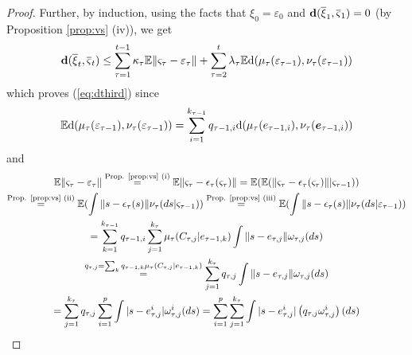 \documentclass{article}              %
\begin{document}
\begin{proof}
Further, by induction, 
using the facts that $\xi_{0}=\varepsilon_{0}$ and $\mathbf{d}(\overline{\xi}_{1},\overline{\varsigma}_{1})=0$
(by Proposition \ref{prop:vs} (iv)), we get
\[
\mathbf{d}(\overline{\xi}_{t},\overline{\varsigma}_{t})\leq\sum_{\tau=1}^{t-1}\kappa_{\tau}\mathbb{E}\|\varsigma_{\tau}-\varepsilon_{\tau}\|+\sum_{\tau=2}^{t}\lambda_{\tau}\mathbb{E}\mathrm{d}(\mu_{\tau}(\varepsilon_{\text{\ensuremath{\tau}}-1}),\nu_{\tau}(\varepsilon_{\tau-1}))
\]
which proves (\ref{eq:dthird}) since 
\[
\mathbb{E}\mathrm{d}(\mu_{\tau}(\varepsilon_{\text{\ensuremath{\tau}}-1}),\nu_{\tau}(\varepsilon_{\tau-1}))=\sum_{i=1}^{k_{\tau-1}}q_{\tau-1,i}\mathrm{d}(\mu_{\tau}(e_{\text{\ensuremath{\tau}}-1,i}),\nu_{\tau}(\boldsymbol{e}_{\tau-1,i}))
\]
and  
\begin{multline*}
\mathbb{E}\|\varsigma_{\tau}-\varepsilon_{\tau}\|\stackrel{\text{Prop. \ref{prop:vs} (i)}}{=}\mathbb{E}\|\varsigma_{\tau}-\epsilon_{\tau}(\varsigma_{\tau})\|=\mathbb{E}(\mathbb{E}(\|\varsigma_{\tau}-\epsilon_{\tau}(\varsigma_{\tau})\||\varsigma_{\tau-1}))\\
\stackrel{\text{Prop. \ref{prop:vs} (ii)}}{=}\mathbb{E}(\int\|s-\epsilon_{\tau}(s)\|\nu_{\tau}(ds|\varsigma_{\tau-1}))\stackrel{\text{Prop. \ref{prop:vs} (iii)}}{=}\mathbb{E}(\int\|s-\epsilon_{\tau}(s)\|\nu_{\tau}(ds|\varepsilon_{\tau-1}))\\
=\sum_{k=1}^{k_{\tau-1}}q_{\tau-1,i}\sum_{j=1}^{k_{\tau}}\mu_{\tau}(C_{\tau,j}|e_{\tau-1,k})\int\|s-e_{\tau,j}\|\omega_{\tau,j}(ds)\\
\stackrel{q_{\tau,j}=\sum_{k}q_{\tau-1,k}\mu_{\tau}(C_{\tau,j}|e_{\tau-1,k})}{=}\sum_{j=1}^{k_{\tau}}q_{\tau,j}\int\|s-e_{\tau,j}\|\omega_{\tau,j}(ds)\\
=\sum_{j=1}^{k_{\tau}}q_{\tau,j}\sum_{i=1}^{p}\int|s-e_{\tau,j}^{i}|\omega_{\tau,j}^{i}(ds)=\sum_{i=1}^{p}\sum_{j=1}^{k_{\tau}}\int|s-e_{\tau,j}^{i}|\left(q_{\tau,j}\omega_{\tau,j}^{i}\right)(ds)
\end{multline*}
\end{proof}
\end{document}
